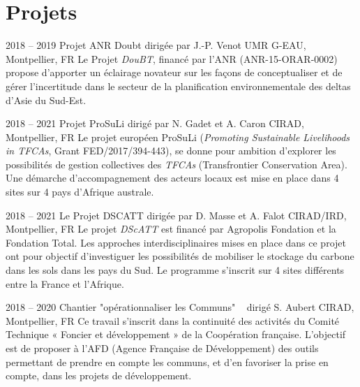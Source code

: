 \documentclass[]{cv-etienne}
\begin{document}
\section{Projets}
\begin{entrylist}
\entry
{2018 -- 2019}
{Projet ANR Doubt {\normalfont dirigée par J.-P. Venot}}
{UMR G-EAU, Montpellier, FR}
{Le Projet \emph{DouBT}, financé par l'ANR (ANR-15-ORAR-0002) propose d'apporter un éclairage novateur sur les façons de conceptualiser et de gérer l'incertitude dans le secteur de la planification environnementale des deltas d'Asie du Sud-Est.}
\end{entrylist}
\begin{entrylist}
\entry
{2018 -- 2021}
{Projet ProSuLi {\normalfont dirigé par N. Gadet et A. Caron}}
{CIRAD, Montpellier, FR}
{Le projet européen ProSuLi (\emph{Promoting Sustainable Livelihoods in TFCAs}, Grant FED/2017/394-443), se donne pour ambition d'explorer les possibilités de gestion collectives des \emph{TFCAs} (Transfrontier Conservation Area). Une démarche d'accompagnement des acteurs locaux est mise en place dans 4 sites sur 4 pays d'Afrique australe.}
\end{entrylist}
\begin{entrylist}
\entry
{2018 -- 2021}
{Le Projet DSCATT {\normalfont dirigée par D. Masse et A. Falot}}
{CIRAD/IRD, Montpellier, FR}
{Le projet \emph{DScATT} est financé par Agropolis Fondation et la Fondation Total. Les approches interdisciplinaires mises en place dans ce projet ont pour objectif d'investiguer les possibilités de mobiliser le stockage du carbone dans les sols dans les pays du Sud. Le programme s'inscrit sur 4 sites différents entre la France et l'Afrique.}
\end{entrylist}
\begin{entrylist}
\entry
{2018 -- 2020}
{Chantier "opérationnaliser les Communs" {\normalfont ~ dirigé S. Aubert}}
{CIRAD, Montpellier, FR}
{Ce travail s'inscrit dans la continuité des activités du Comité Technique « Foncier et développement » de la Coopération française. L'objectif est de proposer à l'AFD (Agence Française de Développement) des outils permettant de prendre en compte les communs, et d'en favoriser la prise en compte, dans les projets de développement.}
\end{entrylist}
\end{document}
